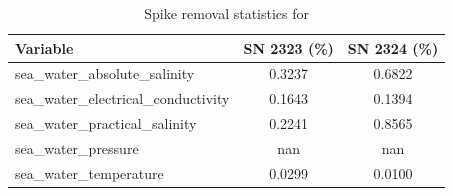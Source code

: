 \begin{table}[h]
\centering
\caption{Spike removal statistics for \projectname{} \casenumber{}}
\label{tab:ntas13_spike_stats}
\begin{tabular}{|l|c|c|}
\hline
Variable & SN 2323 (\%) & SN 2324 (\%) \\
\hline
sea\_water\_absolute\_salinity & 0.3237 & 0.6822 \\
sea\_water\_electrical\_conductivity & 0.1643 & 0.1394 \\
sea\_water\_practical\_salinity & 0.2241 & 0.8565 \\
sea\_water\_pressure & nan & nan \\
sea\_water\_temperature & 0.0299 & 0.0100 \\
\hline
\end{tabular}
\end{table}
